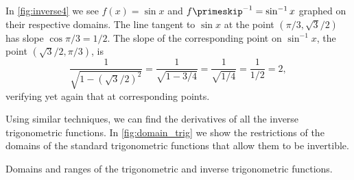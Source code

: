 

In \autoref{fig:inverse4} we see $f(x) = \sin x$ and $f\primeskip^{-1} = \sin^{-1} x$ graphed on their respective domains. The line tangent to $\sin x$ at the point $(\pi/3, \sqrt{3}/2)$ has slope $\cos \pi/3 = 1/2$. The slope of the corresponding point on $\sin^{-1}x$, the point $(\sqrt{3}/2,\pi/3)$, is $$\frac{1}{\sqrt{1-(\sqrt{3}/2)^2}} = \frac{1}{\sqrt{1-3/4}} = \frac{1}{\sqrt{1/4}} = \frac{1}{1/2}=2,$$ verifying yet again that at corresponding points.\bigskip

Using similar techniques, we can find the derivatives of all the inverse trig\-o\-no\-metric functions. In \autoref{fig:domain_trig} we show the restrictions of the domains of the standard trigonometric functions that allow them to be invertible.

\begin{lxfigure}
\small\noindent
\flushinner{%
\begin{tabular}{ccc @{\hspace{2em}} ccc}
Function & Domain & Range &\parbox[b]{40pt}{\centering Inverse Function} & Domain & Range\\ \cmidrule(r{2em}){1-3}\cmidrule(l{-1em}){4-6}
$\sin x$ & $[-\pi/2,\pi/2]$ & $[-1,1]$&$\sin^{-1}x$ & $[-1,1]$ & $[-\pi/2,\pi/2]$ \\
$\cos x$ & $[0,\pi]$ & $[-1,1]$&$\cos^{-1}(x)$ & $[-1,1]$ & $[0,\pi]$ \\
$\tan x$ & $(-\pi/2,\pi/2)$ & $(-\infty,\infty)$&$\tan^{-1}(x)$ & $(-\infty,\infty)$ & $(-\pi/2,\pi/2)$	\\
$\csc x$ & $[-\pi/2,0)\cup (0, \pi/2]$ & $(-\infty,-1]\cup [1,\infty)$&$\csc^{-1} x$ & $(-\infty,-1]\cup [1,\infty)$ & $[-\pi/2,0)\cup (0, \pi/2]$  \\
$\sec x$ & $[0,\pi/2)\cup (\pi/2,\pi]$ & $(-\infty,-1]\cup [1,\infty)$&$\sec^{-1}(x)$ & $(-\infty,-1]\cup [1,\infty)$ & $[0,\pi/2)\cup (\pi/2,\pi]$ \\
$\cot x$ & $(0,\pi)$ & $(-\infty,\infty)$&$\cot^{-1}(x)$ &  $ (-\infty,\infty)$ & $(0,\pi)$	
\end{tabular}}
\captionsetup{type=figure}
\caption{Domains and ranges of the trigonometric and inverse trigonometric functions.}\label{fig:domain_trig}
\end{lxfigure}

